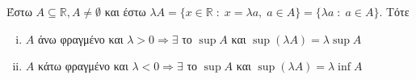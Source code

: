 \begin{mybox3}
\begin{prop}
  Έστω $ A \subseteq \mathbb{R}, A \neq \emptyset $ και έστω $ \lambda A = 
  \{ x \in \mathbb{R} \; : \; x = \lambda a, \; a \in A \} = \{ \lambda a \; : \; 
  a \in A\} $. Τότε
  \begin{enumerate}[(i)]
    \item $ A $ άνω φραγμένο και $ \lambda >0 \Rightarrow \exists $ το $ \sup A $
      και $ \sup (\lambda A) = \lambda \sup A $
    \item $ A $ κάτω φραγμένο και $ \lambda <0 \Rightarrow \exists $ το $ \sup A $
      και $ \sup (\lambda A) = \lambda \inf A $
  \end{enumerate}
\end{prop}
\end{mybox3}

